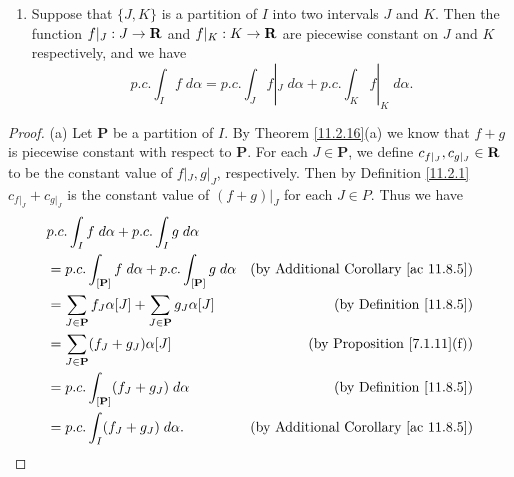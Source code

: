 \begin{additional corollary}
\begin{enumerate}
\[\begin{cases}
              \end{cases}
          \]
          Then \(F\) is piecewise constant on \(J\), and \(p.c. \int_J F \; d \alpha = p.c. \int_I f \; d \alpha\).
    \item Suppose that \(\{J, K\}\) is a partition of \(I\) into two intervals \(J\) and \(K\).
          Then the function \(f|_J : J \to \mathbf{R}\) and \(f|_K : K \to \mathbf{R}\) are piecewise constant on \(J\) and \(K\) respectively, and we have
          \[
              p.c. \int_I f \; d \alpha = p.c. \int_J f|_J \; d \alpha + p.c. \int_K f|_K \; d \alpha.
          \]
\end{enumerate}
\end{additional corollary}

\begin{proof}{(a)}
    Let \(\mathbf{P}\) be a partition of \(I\).
    By Theorem \ref{11.2.16}(a) we know that \(f + g\) is piecewise constant with respect to \(\mathbf{P}\).
    For each \(J \in \mathbf{P}\), we define \(c_{f|_J}, c_{g|_J} \in \mathbf{R}\) to be the constant value of \(f|_J, g|_J\), respectively.
    Then by Definition \ref{11.2.1} \(c_{f|_J} + c_{g|_J}\) is the constant value of \((f + g)|_J\) for each \(J \in P\).
    Thus we have
    \begin{align*}
         & p.c. \int_I f \; d \alpha + p.c. \int_I g \; d \alpha                                                                                \\
         & = p.c. \int_{[\mathbf{P}]} f \; d \alpha + p.c. \int_{[\mathbf{P}]} g \; d \alpha & \text{(by Additional Corollary \ref{ac 11.8.5})} \\
         & = \sum_{J \in \mathbf{P}} f_J \alpha[J] + \sum_{J \in \mathbf{P}} g_J \alpha[J]   & \text{(by Definition \ref{11.8.5})}              \\
         & = \sum_{J \in \mathbf{P}} (f_J + g_J) \alpha[J]                                   & \text{(by Proposition \ref{7.1.11}(f))}          \\
         & = p.c. \int_{[\mathbf{P}]} (f_J + g_J) \; d \alpha                                & \text{(by Definition \ref{11.8.5})}              \\
         & = p.c. \int_I (f_J + g_J) \; d \alpha.                                            & \text{(by Additional Corollary \ref{ac 11.8.5})}
    \end{align*}
\end{proof}

